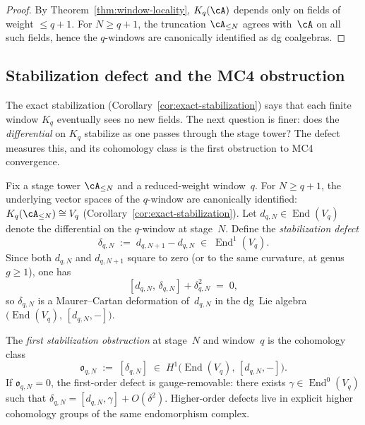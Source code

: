 \begin{proof}
By Theorem~\ref{thm:window-locality}, $K_q(\cA)$ depends only on
fields of weight $\leq q + 1$. For $N \geq q + 1$, the truncation
$\cA_{\leq N}$ agrees with~$\cA$ on all such fields, hence the
$q$-windows are canonically identified as dg coalgebras.
\end{proof}

\subsection{Stabilization defect and the MC4 obstruction}
\label{subsec:nms-stabilization-defect}

The exact stabilization
(Corollary~\ref{cor:exact-stabilization}) says that each finite
window $K_q$ eventually sees no new fields. The next question is
finer: does the \emph{differential} on $K_q$ stabilize as one
passes through the stage tower? The defect measures this, and its
cohomology class is the first obstruction to MC4 convergence.

\begin{definition}
\label{def:stabilization-defect}%
%
Fix a stage tower $\cA_{\leq N}$ and a reduced-weight window~$q$.
For $N \geq q + 1$, the underlying vector spaces of the $q$-window
are canonically identified:
$K_q(\cA_{\leq N}) \cong V_q$
(Corollary~\ref{cor:exact-stabilization}).
Let $d_{q,N} \in \operatorname{End}(V_q)$ denote the differential
on the $q$-window at stage~$N$. Define the \emph{stabilization
defect}
\begin{equation}\label{eq:nms-stabilization-defect}
\delta_{q,N}
\;:=\;
d_{q,N+1} - d_{q,N}
\;\in\;
\operatorname{End}^1(V_q).
\end{equation}
Since both $d_{q,N}$ and $d_{q,N+1}$ square to zero (or to the
same curvature, at genus $g \geq 1$), one has
\begin{equation}\label{eq:nms-defect-mc-relation}
[d_{q,N},\, \delta_{q,N}] + \delta_{q,N}^2 \;=\; 0,
\end{equation}
so $\delta_{q,N}$ is a Maurer--Cartan deformation of~$d_{q,N}$
in the dg~Lie algebra
$\bigl(\operatorname{End}(V_q),\, [d_{q,N}, -]\bigr)$.
\end{definition}

\begin{definition}
\label{def:stabilization-obstruction}%
%
%
The \emph{first stabilization obstruction} at stage~$N$ and
window~$q$ is the cohomology class
\begin{equation}\label{eq:nms-stabilization-obstruction}
\mathfrak{o}_{q,N}
\;:=\;
[\delta_{q,N}]
\;\in\;
H^1\bigl(\operatorname{End}(V_q),\, [d_{q,N}, -]\bigr).
\end{equation}
If $\mathfrak{o}_{q,N} = 0$, the first-order defect is
gauge-removable: there exists $\gamma \in \operatorname{End}^0(V_q)$
such that
$\delta_{q,N} = [d_{q,N}, \gamma] + O(\delta^2)$.
Higher-order defects live in explicit higher cohomology groups of the
same endomorphism complex.
\end{definition}


